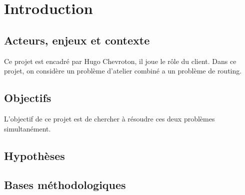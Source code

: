 \chapter{Introduction}

\section{Acteurs, enjeux et contexte}
Ce projet est encadré par Hugo Chevroton, il joue le rôle du client.
Dans ce projet, on considère un problème d'atelier combiné a un problème de routing.

\section{Objectifs}
L'objectif de ce projet est de chercher à résoudre ces deux problèmes simultanément.
\section{Hypothèses}
\section{Bases méthodologiques}